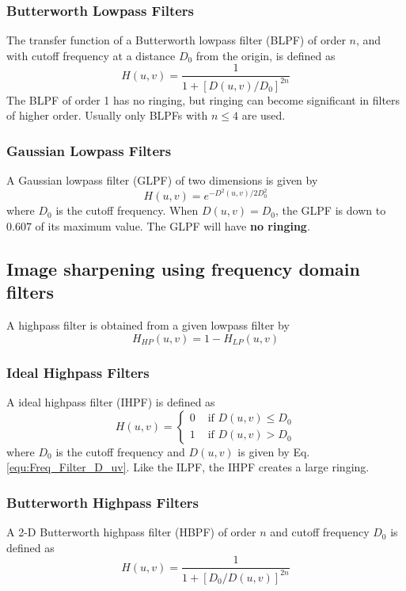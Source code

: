 \subsubsection{Butterworth Lowpass Filters}
The transfer function of a Butterworth lowpass filter (BLPF) of order $n$, and with cutoff frequency at a distance $D_0$ from the origin, is defined as
\begin{equation}
	H(u,v) = \frac{1}{1 + \left[ D(u,v) / D_0 \right]^{2n}}
\end{equation}
The BLPF of order 1 has no ringing, but ringing can become significant in filters of higher order. Usually only BLPFs with $n \leq 4$ are used.

\subsubsection{Gaussian Lowpass Filters}
A Gaussian lowpass filter (GLPF) of two dimensions is given by
\begin{equation}
	H(u,v) = e^{-D^2(u,v)/2D_0^2}
\end{equation}
where $D_0$ is the cutoff frequency. When $D(u,v)=D_0$, the GLPF is down to $0.607$ of its maximum value. The GLPF will have \textbf{no ringing}.

\subsection{Image sharpening using frequency domain filters }
A highpass filter is obtained from a given lowpass filter by
\begin{equation}
	H_{HP}(u,v) = 1 - H_{LP}(u,v)
\end{equation}

\subsubsection{Ideal Highpass Filters}
A ideal highpass filter (IHPF) is defined as
\begin{equation}
	H(u,v) = 
		\begin{cases}
			0 & \text{  if } D(u,v) \leq D_0 \\
			1 & \text{  if } D(u,v) > D_0
		\end{cases}
\end{equation}
where $D_0$ is the cutoff frequency and $D(u,v)$ is given by Eq. \ref{equ:Freq_Filter_D_uv}. Like the ILPF, the IHPF creates a large ringing.

\subsubsection{Butterworth Highpass Filters}
A 2-D Butterworth highpass filter (HBPF) of order $n$ and cutoff frequency $D_0$ is defined as 
\begin{equation}
	H(u,v) = \frac{1}{1 + \left[ D_0 / D(u,v) \right]^{2n}}
\end{equation}

